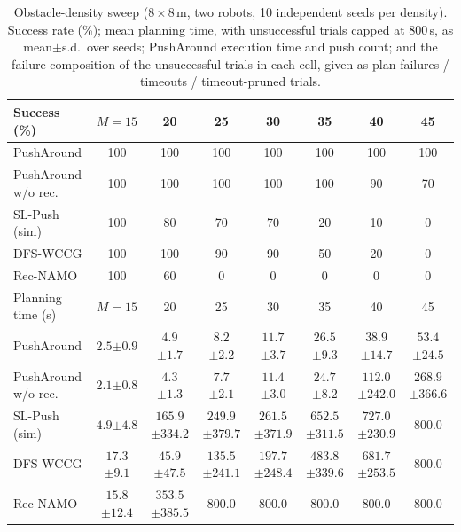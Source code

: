 \documentclass[11pt]{article}
\begin{document}
\begin{table}[!ht]
\centering
\footnotesize
\caption{Obstacle-density sweep ($8{\times}8$\,m, two robots, 10 independent
seeds per density). Success rate (\%); mean planning time, with unsuccessful
trials capped at $800$\,s, as mean$\pm$s.d.\ over seeds; PushAround execution
time and push count; and the failure composition of the unsuccessful trials in
each cell, given as plan failures / timeouts / timeout-pruned trials.}
\label{tab:dens-full}
\setlength{\tabcolsep}{1.9pt}\renewcommand{\arraystretch}{0.95}
\begin{tabular}{lccccccc}
\toprule
Success (\%) & $M{=}15$ & 20 & 25 & 30 & 35 & 40 & 45\\
\midrule
PushAround          & 100 & 100 & 100 & 100 & 100 & 100 & 100\\
PushAround w/o rec. & 100 & 100 & 100 & 100 & 100 & 90  & 70\\
SL-Push (sim)       & 100 & 80  & 70  & 70  & 20  & 10  & 0\\
DFS-WCCG            & 100 & 100 & 90  & 90  & 50  & 20  & 0\\
Rec-NAMO            & 100 & 60  & 0   & 0   & 0   & 0   & 0\\
\midrule
Planning time (s) & $M{=}15$ & 20 & 25 & 30 & 35 & 40 & 45\\
\midrule
PushAround          & $2.5${\footnotesize$\pm0.9$} & $4.9${\footnotesize$\pm1.7$} & $8.2${\footnotesize$\pm2.2$} & $11.7${\footnotesize$\pm3.7$} & $26.5${\footnotesize$\pm9.3$} & $38.9${\footnotesize$\pm14.7$} & $53.4${\footnotesize$\pm24.5$}\\
PushAround w/o rec. & $2.1${\footnotesize$\pm0.8$} & $4.3${\footnotesize$\pm1.3$} & $7.7${\footnotesize$\pm2.1$} & $11.4${\footnotesize$\pm3.0$} & $24.7${\footnotesize$\pm8.2$} & $112.0${\footnotesize$\pm242.0$} & $268.9${\footnotesize$\pm366.6$}\\
SL-Push (sim)       & $4.9${\footnotesize$\pm4.8$} & $165.9${\footnotesize$\pm334.2$} & $249.9${\footnotesize$\pm379.7$} & $261.5${\footnotesize$\pm371.9$} & $652.5${\footnotesize$\pm311.5$} & $727.0${\footnotesize$\pm230.9$} & 800.0\\
DFS-WCCG            & $17.3${\footnotesize$\pm9.1$} & $45.9${\footnotesize$\pm47.5$} & $135.5${\footnotesize$\pm241.1$} & $197.7${\footnotesize$\pm248.4$} & $483.8${\footnotesize$\pm339.6$} & $681.7${\footnotesize$\pm253.5$} & 800.0\\
Rec-NAMO            & $15.8${\footnotesize$\pm12.4$} & $353.5${\footnotesize$\pm385.5$} & 800.0 & 800.0 & 800.0 & 800.0 & 800.0\\

\end{tabular}
\end{table}
\end{document}
